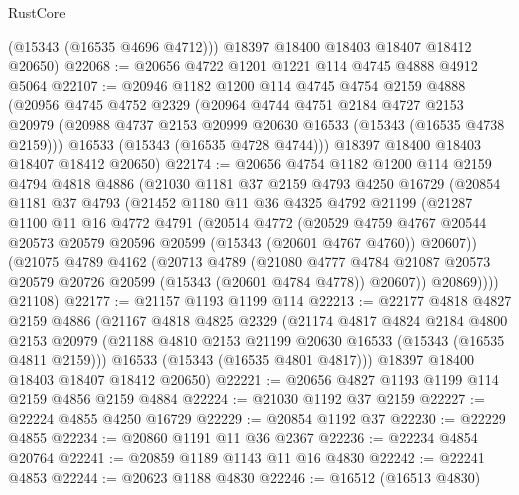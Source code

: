 \begin{lexlean}{RustCore}
\begin{coremodule}
        (@15343 (@16535 @4696 @4712)))
      @18397
      @18400
      @18403
      @18407
      @18412
      @20650)
@22068 := @20656 @4722 @1201 @1221 @114 @4745 @4888 @4912 @5064
@22107 := @20946
    @1182
    @1200
    @114
    @4745
    @4754
    @2159
    @4888
    (@20956
      @4745
      @4752
      @2329
      (@20964
        @4744
        @4751
        @2184
        @4727
        @2153
        @20979
        (@20988 @4737 @2153 @20999 @20630 @16533 (@15343 (@16535 @4738 @2159)))
        @16533
        (@15343 (@16535 @4728 @4744)))
      @18397
      @18400
      @18403
      @18407
      @18412
      @20650)
@22174 := @20656
    @4754
    @1182
    @1200
    @114
    @2159
    @4794
    @4818
    @4886
    (@21030
      @1181
      @37
      @2159
      @4793
      @4250
      @16729
      (@20854
        @1181
        @37
        @4793
        (@21452
          @1180
          @11
          @36
          @4325
          @4792
          @21199
          (@21287
            @1100
            @11
            @16
            @4772
            @4791
            (@20514
              @4772
              (@20529
                @4759
                @4767
                @20544
                @20573
                @20579
                @20596
                @20599
                (@15343 (@20601 @4767 @4760))
                @20607))
            (@21075
              @4789
              @4162
              (@20713
                @4789
                (@21080
                  @4777
                  @4784
                  @21087
                  @20573
                  @20579
                  @20726
                  @20599
                  (@15343 (@20601 @4784 @4778))
                  @20607))
              @20869))))
      @21108)
@22177 := @21157 @1193 @1199 @114
@22213 := @22177
    @4818
    @4827
    @2159
    @4886
    (@21167
      @4818
      @4825
      @2329
      (@21174
        @4817
        @4824
        @2184
        @4800
        @2153
        @20979
        (@21188 @4810 @2153 @21199 @20630 @16533 (@15343 (@16535 @4811 @2159)))
        @16533
        (@15343 (@16535 @4801 @4817)))
      @18397
      @18400
      @18403
      @18407
      @18412
      @20650)
@22221 := @20656 @4827 @1193 @1199 @114 @2159 @4856 @2159 @4884
@22224 := @21030 @1192 @37 @2159
@22227 := @22224 @4855 @4250 @16729
@22229 := @20854 @1192 @37
@22230 := @22229 @4855
@22234 := @20860 @1191 @11 @36 @2367
@22236 := @22234 @4854 @20764
@22241 := @20859 @1189 @1143 @11 @16 @4830
@22242 := @22241 @4853
@22244 := @20623 @1188 @4830
@22246 := @16512 (@16513 @4830)

\end{coremodule}
\end{lexlean}
